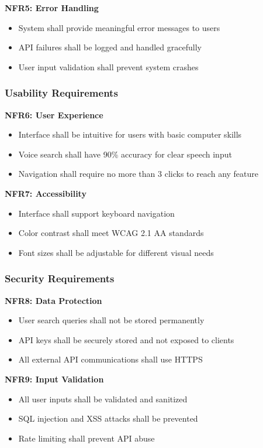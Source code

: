 \documentclass[12pt,a4paper]{article}
\begin{document}
\textbf{NFR5: Error Handling}
\begin{itemize}
    \item System shall provide meaningful error messages to users
    \item API failures shall be logged and handled gracefully
    \item User input validation shall prevent system crashes
\end{itemize}

\subsubsection{Usability Requirements}

\textbf{NFR6: User Experience}
\begin{itemize}
    \item Interface shall be intuitive for users with basic computer skills
    \item Voice search shall have 90\% accuracy for clear speech input
    \item Navigation shall require no more than 3 clicks to reach any feature
\end{itemize}

\textbf{NFR7: Accessibility}
\begin{itemize}
    \item Interface shall support keyboard navigation
    \item Color contrast shall meet WCAG 2.1 AA standards
    \item Font sizes shall be adjustable for different visual needs
\end{itemize}

\subsubsection{Security Requirements}

\textbf{NFR8: Data Protection}
\begin{itemize}
    \item User search queries shall not be stored permanently
    \item API keys shall be securely stored and not exposed to clients
    \item All external API communications shall use HTTPS
\end{itemize}

\textbf{NFR9: Input Validation}
\begin{itemize}
    \item All user inputs shall be validated and sanitized
    \item SQL injection and XSS attacks shall be prevented
    \item Rate limiting shall prevent API abuse
\end{itemize}
\end{document}
